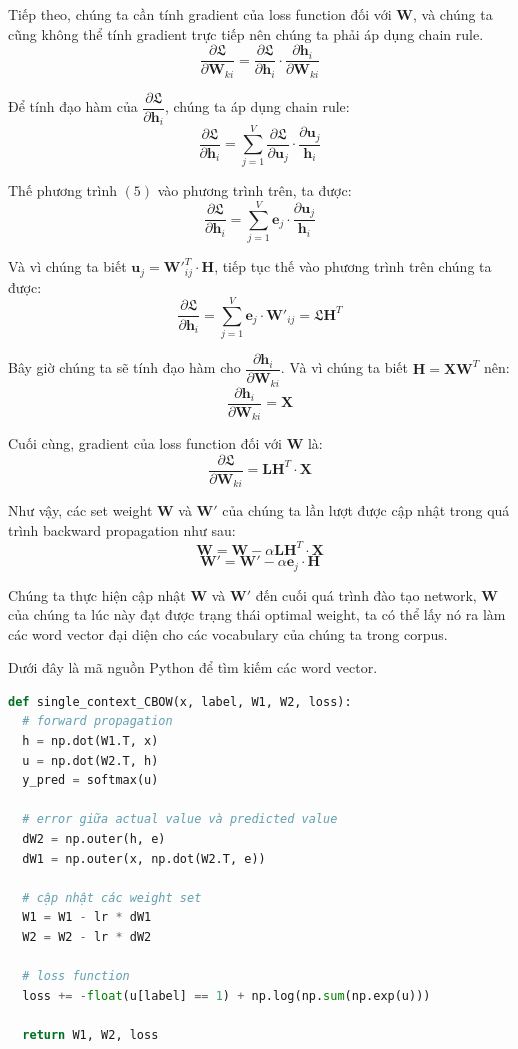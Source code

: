 \documentclass[12pt]{article}
\begin{document}
\indent Tiếp theo, chúng ta cần tính gradient của loss function đối với $\boldsymbol{W}$, và chúng ta cũng không thể tính gradient trực tiếp nên chúng ta phải áp dụng chain rule.
$$\dfrac{\partial \mathfrak{L}}{\partial \boldsymbol{W}_{ki}} = \dfrac{\partial \mathfrak{L}}{\partial \boldsymbol{h}_i} \cdot \dfrac{\partial \boldsymbol{h}_i}{\partial \boldsymbol{W}_{ki}}$$

\indent Để tính đạo hàm của $\dfrac{\partial \mathfrak{L}}{\partial \boldsymbol{h}_i}$, chúng ta áp dụng chain rule:
$$\dfrac{\partial \mathfrak{L}}{\partial \boldsymbol{h}_i} = \sum_{j=1}^V \dfrac{\partial \mathfrak{L}}{\partial \boldsymbol{u}_j} \cdot \dfrac{\partial \boldsymbol{u}_j}{\boldsymbol{h}_i}$$

\indent Thế phương trình $(5)$ vào phương trình trên, ta được:
$$\dfrac{\partial \mathfrak{L}}{\partial \boldsymbol{h}_i} = \sum_{j=1}^V \boldsymbol{e}_j \cdot \dfrac{\partial \boldsymbol{u}_j}{\boldsymbol{h}_i}$$

\indent Và vì chúng ta biết $\boldsymbol{u}_j = \boldsymbol{W'}_{ij}^T \cdot \boldsymbol{H}$, tiếp tục thế vào phương trình trên chúng ta được:
$$\dfrac{\partial \mathfrak{L}}{\partial \boldsymbol{h}_i} = \sum_{j=1}^V \boldsymbol{e}_j \cdot \boldsymbol{W'}_{ij} = \mathfrak{L}\boldsymbol{H}^T$$

\indent Bây giờ chúng ta sẽ tính đạo hàm cho $\dfrac{\partial \boldsymbol{h}_i}{\partial \boldsymbol{W}_{ki}}$. Và vì chúng ta biết $\boldsymbol{H} = \boldsymbol{XW}^T$ nên:
$$\dfrac{\partial \boldsymbol{h}_i}{\partial \boldsymbol{W}_{ki}} = \boldsymbol{X}$$

\indent Cuối cùng, gradient của loss function đối với $\boldsymbol{W}$ là:
$$\dfrac{\partial \mathfrak{L}}{\partial \boldsymbol{W}_{ki}} = \boldsymbol{LH}^T \cdot \boldsymbol{X}$$

\indent Như vậy, các set weight $\boldsymbol{W}$ và $\boldsymbol{W'}$ của chúng ta lần lượt được cập nhật trong quá trình backward propagation như sau:
$$\boldsymbol{W} = \boldsymbol{W} - \alpha \boldsymbol{LH}^T \cdot \boldsymbol{X}$$
$$\boldsymbol{W'} = \boldsymbol{W'} - \alpha \boldsymbol{e}_j \cdot \boldsymbol{H}$$

\indent Chúng ta thực hiện cập nhật $\boldsymbol{W}$ và $\boldsymbol{W'}$ đến cuối quá trình đào tạo network, $\boldsymbol{W}$ của chúng ta lúc này đạt được trạng thái optimal weight, ta có thể lấy nó ra làm các word vector đại diện cho các vocabulary của chúng ta trong corpus.

\indent Dưới đây là mã nguồn Python để tìm kiếm các word vector.
\begin{lstlisting}[language=python]
def single_context_CBOW(x, label, W1, W2, loss):
  # forward propagation
  h = np.dot(W1.T, x)
  u = np.dot(W2.T, h)
  y_pred = softmax(u)

  # error giữa actual value và predicted value
  dW2 = np.outer(h, e)
  dW1 = np.outer(x, np.dot(W2.T, e))

  # cập nhật các weight set
  W1 = W1 - lr * dW1
  W2 = W2 - lr * dW2

  # loss function
  loss += -float(u[label] == 1) + np.log(np.sum(np.exp(u)))

  return W1, W2, loss
\end{lstlisting}
\end{document}
